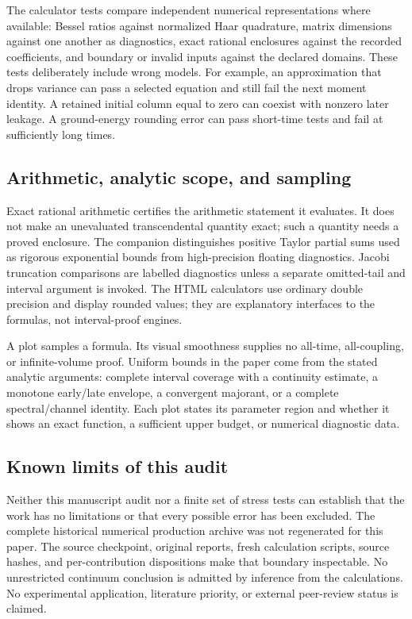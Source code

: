 The calculator tests compare independent numerical representations where available: Bessel ratios against normalized Haar quadrature, matrix dimensions against one another as diagnostics, exact rational enclosures against the recorded coefficients, and boundary or invalid inputs against the declared domains. These tests deliberately include wrong models. For example, an approximation that drops variance can pass a selected equation and still fail the next moment identity. A retained initial column equal to zero can coexist with nonzero later leakage. A ground-energy rounding error can pass short-time tests and fail at sufficiently long times.

\subsection{Arithmetic, analytic scope, and sampling}
Exact rational arithmetic certifies the arithmetic statement it evaluates. It does not make an unevaluated transcendental quantity exact; such a quantity needs a proved enclosure. The companion distinguishes positive Taylor partial sums used as rigorous exponential bounds from high-precision floating diagnostics. Jacobi truncation comparisons are labelled diagnostics unless a separate omitted-tail and interval argument is invoked. The HTML calculators use ordinary double precision and display rounded values; they are explanatory interfaces to the formulas, not interval-proof engines.

A plot samples a formula. Its visual smoothness supplies no all-time, all-coupling, or infinite-volume proof. Uniform bounds in the paper come from the stated analytic arguments: complete interval coverage with a continuity estimate, a monotone early/late envelope, a convergent majorant, or a complete spectral/channel identity. Each plot states its parameter region and whether it shows an exact function, a sufficient upper budget, or numerical diagnostic data.

\subsection{Known limits of this audit}
Neither this manuscript audit nor a finite set of stress tests can establish that the work has no limitations or that every possible error has been excluded. The complete historical numerical production archive was not regenerated for this paper. The source checkpoint, original reports, fresh calculation scripts, source hashes, and per-contribution dispositions make that boundary inspectable. No unrestricted continuum conclusion is admitted by inference from the calculations. No experimental application, literature priority, or external peer-review status is claimed.


